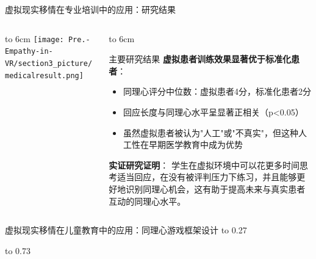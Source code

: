 \documentclass[aspectratio=169,xcolor=dvipsnames]{beamer}
\begin{document}
\begin{frame}{虚拟现实移情在专业培训中的应用：研究结果}
    \begin{columns}[T]
        \begin{column}{0.45\textwidth}
            \vbox to 6cm{
                \vfill
                \centering
                \texttt{[image: Pre.-Empathy-in-VR/section3\_picture/medicalresult.png]}
                \vfill
            }
        \end{column}
        
        \begin{column}{0.55\textwidth}
            \vbox to 6cm{
                \vfill
                \begin{block}{主要研究结果}
                    \textbf{虚拟患者训练效果显著优于标准化患者}：
                    \begin{itemize}
                        \item 同理心评分中位数：虚拟患者4分，标准化患者2分
                        \item 回应长度与同理心水平呈显著正相关（p<0.05）
                        \item 虽然虚拟患者被认为"人工"或"不真实"，但这种人工性在早期医学教育中成为优势
                    \end{itemize}
                    
                    \textbf{实证研究证明}：
                    学生在虚拟环境中可以花更多时间思考适当回应，在没有被评判压力下练习，并且能够更好地识别同理心机会，这有助于提高未来与真实患者互动的同理心水平。
                \end{block}
                \vfill
            }
        \end{column}
    \end{columns}
\end{frame}

\begin{frame}{虚拟现实移情在儿童教育中的应用：同理心游戏框架设计}
    \vbox to 0.27
    
    \vbox to 0.73
\end{frame}
\end{document}
